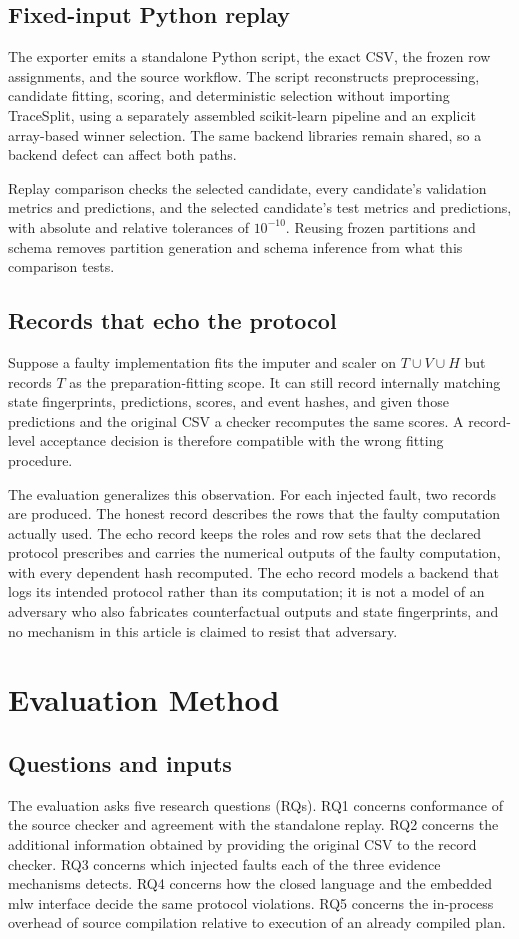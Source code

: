 \documentclass[lettersize,journal]{IEEEtran}
\newcommand{\tool}{TraceSplit}
\begin{document}
\subsection{Fixed-input Python replay}
The exporter emits a standalone Python script, the exact CSV, the frozen row assignments, and the source workflow. The script reconstructs preprocessing, candidate fitting, scoring, and deterministic selection without importing \tool{}, using a separately assembled scikit-learn pipeline and an explicit array-based winner selection. The same backend libraries remain shared, so a backend defect can affect both paths.

Replay comparison checks the selected candidate, every candidate's validation metrics and predictions, and the selected candidate's test metrics and predictions, with absolute and relative tolerances of $10^{-10}$. Reusing frozen partitions and schema removes partition generation and schema inference from what this comparison tests.

\subsection{Records that echo the protocol}\label{sec:echo}
Suppose a faulty implementation fits the imputer and scaler on $T\cup V\cup H$ but records $T$ as the preparation-fitting scope. It can still record internally matching state fingerprints, predictions, scores, and event hashes, and given those predictions and the original CSV a checker recomputes the same scores. A record-level acceptance decision is therefore compatible with the wrong fitting procedure.

The evaluation generalizes this observation. For each injected fault, two records are produced. The honest record describes the rows that the faulty computation actually used. The echo record keeps the roles and row sets that the declared protocol prescribes and carries the numerical outputs of the faulty computation, with every dependent hash recomputed. The echo record models a backend that logs its intended protocol rather than its computation; it is not a model of an adversary who also fabricates counterfactual outputs and state fingerprints, and no mechanism in this article is claimed to resist that adversary.

\section{Evaluation Method}
\subsection{Questions and inputs}
The evaluation asks five research questions (RQs). RQ1 concerns conformance of the source checker and agreement with the standalone replay. RQ2 concerns the additional information obtained by providing the original CSV to the record checker. RQ3 concerns which injected faults each of the three evidence mechanisms detects. RQ4 concerns how the closed language and the embedded mlw interface decide the same protocol violations. RQ5 concerns the in-process overhead of source compilation relative to execution of an already compiled plan.
\end{document}
